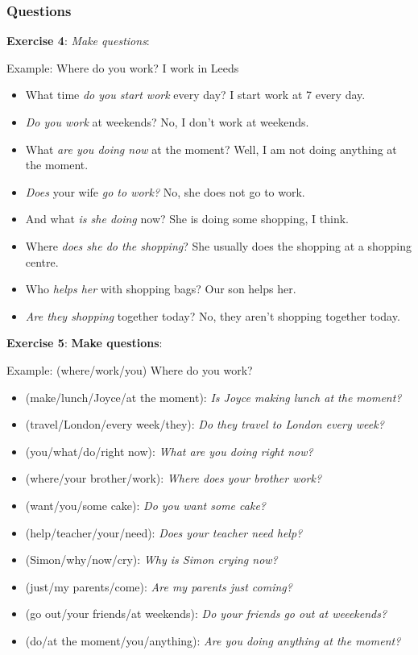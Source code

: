 \subsubsection{Questions}

\textbf{Exercise 4}: \textit{Make questions}:

Example: 
Where do you work?
I work in Leeds

\begin{itemize} 

\item What time \textit{do you start work} every day? I start work at 7 every day.
\item \textit{Do you work} at weekends? No, I don't work at weekends.
\item What \textit{are you doing now} at the moment? Well, I am not doing anything at the moment.
\item \textit{Does} your wife \textit{go to work?} No, she does not go to work.
\item And what \textit{is she doing} now? She is doing some shopping, I think.
\item Where \textit{does she do the shopping}? She usually does the shopping at a shopping centre.
\item Who \textit{helps her} with shopping bags? Our son helps her.
\item \textit{Are they shopping} together today? No, they aren't  shopping together today.

\end{itemize}

\textbf{Exercise 5}: \textbf{Make questions}:

Example: 
(where/work/you)
Where do you work?

\begin{itemize}

\item (make/lunch/Joyce/at the moment): \textit{Is Joyce making lunch at the moment?}
\item (travel/London/every week/they): \textit{Do they travel to London every week?}
\item (you/what/do/right now): \textit{What are you doing right now?}
\item (where/your brother/work): \textit{Where does your brother work?}
\item (want/you/some cake): \textit{Do you want some cake?}
\item (help/teacher/your/need): \textit{Does your teacher need help?}
\item (Simon/why/now/cry): \textit{Why is Simon crying now?}
\item (just/my parents/come): \textit{Are my parents just coming?}
\item (go out/your friends/at weekends): \textit{Do your friends go out at weeekends?}
\item (do/at the moment/you/anything): \textit{Are you doing anything at the moment?}

\end{itemize}

